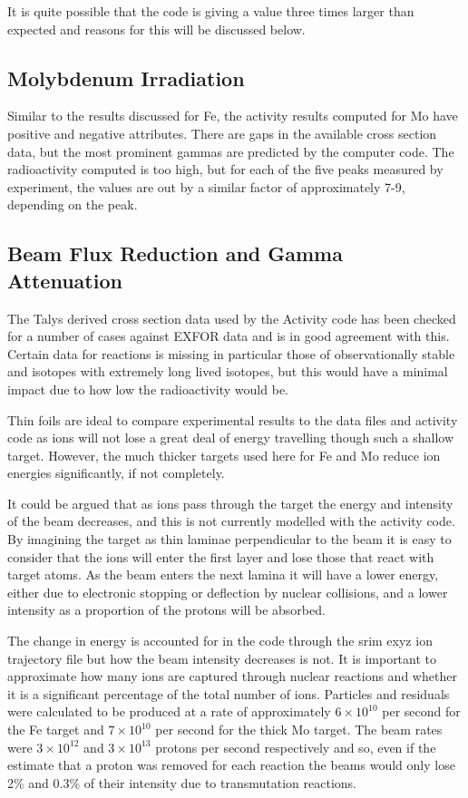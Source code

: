 It is quite possible that the code is giving a value three times larger than expected and reasons for this will be discussed below.


\subsection{Molybdenum Irradiation}
\label{section:moirradiation}

Similar to the results discussed for Fe, the activity results computed for \Gls{Mo} have positive and negative attributes.  There are gaps in the available cross section data, but the most prominent gammas are predicted by the computer code.  The radioactivity computed is too high, but for each of the five peaks measured by experiment, the values are out by a similar factor of approximately 7-9, depending on the peak.


\subsection{Beam Flux Reduction and Gamma Attenuation}

The Talys derived cross section data used by the Activity code has been checked for a number of cases against EXFOR data and is in good agreement with this.  Certain data for reactions is missing in particular those of observationally stable and isotopes with extremely long lived isotopes, but this would have a minimal impact due to how low the radioactivity would be.

Thin foils are ideal to compare experimental results to the data files and activity code as ions will not lose a great deal of energy travelling though such a shallow target.  However, the much thicker targets used here for Fe and Mo reduce ion energies significantly, if not completely.

It could be argued that as ions pass through the target the energy and intensity of the beam decreases, and this is not currently modelled with the activity code.  By imagining the target as thin laminae perpendicular to the beam it is easy to consider that the ions will enter the first layer and lose those that react with target atoms.  As the beam enters the next lamina it will have a lower energy, either due to electronic stopping or deflection by nuclear collisions, and a lower intensity as a proportion of the protons will be absorbed.

The change in energy is accounted for in the code through the \acrshort{srim} exyz ion trajectory file but how the beam intensity decreases is not.  It is important to approximate how many ions are captured through nuclear reactions and whether it is a significant percentage of the total number of ions.  Particles and residuals were calculated to be produced at a rate of approximately $6\times10^{10}$ per second for the Fe target and $7\times10^{10}$ per second for the thick Mo target.  The beam rates were $3 \times 10^{12}$ and $3 \times 10^{13}$ protons per second respectively and so, even if the estimate that a proton was removed for each reaction the beams would only lose 2\% and 0.3\% of their intensity due to transmutation reactions.

